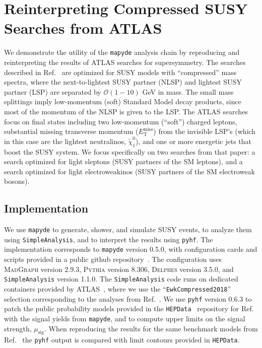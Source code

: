 \documentclass{article}
\newcommand{\chioz}{\ensuremath{\widetilde{\chi}_{1}^{0}}}
\newcommand{\met}{\ensuremath{E_{\mathrm{T}}^{\mathrm{miss}}}}
\newcommand{\mapyde}{\texttt{mapyde}}
\newcommand{\simpleanalysis}{\texttt{SimpleAnalysis}}
\newcommand{\madgraph}{\textsc{MadGraph}}
\newcommand{\pythia}{\textsc{Pythia}}
\newcommand{\delphes}{\textsc{Delphes}}
\newcommand{\pyhf}{\texttt{pyhf}}
\newcommand{\musig}{\ensuremath{\mu_{\mathrm{sig}}}}
\newcommand{\hepdata}{\texttt{HEPData}}
\begin{document}
\section{Reinterpreting Compressed SUSY Searches from ATLAS}
\label{sec:reinterpreting-compressed-susy-searches-from-atlas}

We demonstrate the utility of the \mapyde{} analysis chain by reproducing and reinterpreting the results of ATLAS searches for supersymmetry.  The searches described in Ref.~\cite{ATLAS:2019lng} are optimized for SUSY models with \enquote{compressed} mass spectra, where the next-to-lightest SUSY partner (NLSP) and lightest SUSY partner (LSP) are separated by $\mathcal{O}(1-10)$ GeV in mass.  The small mass splittings imply low-momentum (soft) Standard Model decay products, since most of the momentum of the NLSP is given to the LSP.  The ATLAS searches focus on final states including two low-momentum (\enquote{soft}) charged leptons, substantial missing transverse momentum (\met) from the invisible LSP's (which in this case are the lightest neutralinos, \chioz), and one or more energetic jets that boost the SUSY system.  We focus specifically on two searches from that paper: a search optimized for light sleptons (SUSY partners of the SM leptons), and a search optimized for light electroweakinos (SUSY partners of the SM electroweak bosons).

\subsection{Implementation}
\label{ssec:implementation}

We use \mapyde{} to generate, shower, and simulate SUSY events, to analyze them using \simpleanalysis, and to interpret the results using \pyhf.  The implementation corresponds to \mapyde{} version 0.5.0, with configuration cards and scripts provided in a public github repository~\cite{mapyde-user}.  The configuration uses \madgraph{} version 2.9.3, \pythia{} version 8.306, \delphes{} version 3.5.0, and \simpleanalysis{} version 1.1.0.  The \simpleanalysis{} code runs on dedicated containers provided by ATLAS~\cite{SAGitLabRegistry}, where we use the \enquote{\texttt{EwkCompressed2018}} selection corresponding to the analyses from Ref.~\cite{ATLAS:2019lng}.  We use \pyhf{} version 0.6.3 to patch the public probability models provided in the \hepdata~\cite{HepData} repository for Ref.~\cite{ATLAS:2019lng} with the signal yields from \mapyde, and to compute upper limits on the signal strength, \musig.  When reproducing the results for the same benchmark models from Ref.~\cite{ATLAS:2019lng} the \pyhf{} output is compared with limit contours provided in \hepdata.
\end{document}

